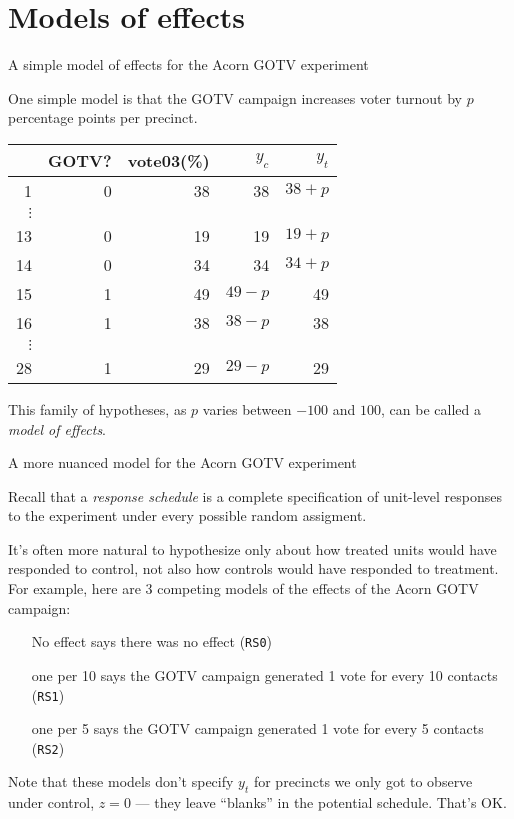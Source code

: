 \section{Models of effects}
\begin{frame}{A simple model of effects for the Acorn GOTV experiment}
  
One simple model is that the GOTV campaign increases voter turnout by $p$ percentage points per precinct.

\begin{center}
  \begin{tabular}{r|rr|rr}
  \hline
 & GOTV? & vote03(\%)& $y_c$ & $y_t$ \\ 
  \hline
1 & 0 & 38 & 38 & $38+p$\\
$\vdots$& & & & \\
13 & 0 & 19 & 19& $19+p$\\ 
14 & 0 & 34 & 34& $34+p$\\ 
15 & 1 & 49 & $49-p$& 49\\ 
16 & 1 & 38 & $38-p$& 38\\ 
$\vdots$& & & & \\
28 & 1 & 29 & $29-p$& 29\\
   \hline
\end{tabular}

\end{center}

This family of hypotheses, as $p$ varies between $-100$ and $100$, can be called a \textit{model of effects}.
\end{frame}

\begin{frame}{A more nuanced model for the Acorn GOTV experiment}

Recall that a \textit{response schedule} is a complete specification of unit-level responses to the experiment under every possible random assigment. 

It's often more natural to hypothesize only about how treated units would have responded to control, not also how controls would have responded to treatment. For example, here are 3 competing models of the effects of the Acorn GOTV campaign: 
\begin{itemize}
\item[No effect] says there was no effect (\texttt{RS0})
\item[one per 10] says the GOTV campaign generated 1 vote for every 10 contacts (\texttt{RS1})
\item[one per 5]says the GOTV campaign generated 1 vote for every 5 contacts (\texttt{RS2})
\end{itemize}

\pause
Note that these models don't specify $y_{t}$ for precincts we only got to observe under control, $z=0$ --- they leave ``blanks'' in the potential schedule.  That's OK.

\end{frame}



